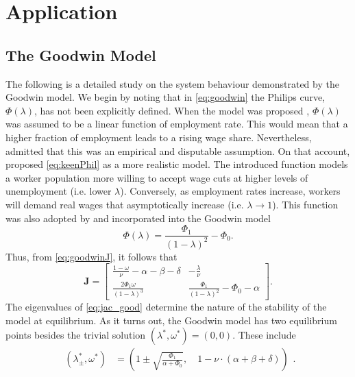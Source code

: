 \documentclass[12pt, centerh1]{article}
\begin{document}
\section{Application}

\subsection{The Goodwin Model}
The following is a detailed study on the system behaviour demonstrated by the Goodwin model. We begin by noting that in \eqref{eq:goodwin} the Philips curve, $\Phi(\lambda)$, has not been explicitly defined. When the model was proposed \citep{goodwin1982growth}, $\Phi(\lambda)$ was assumed to be a linear function of employment rate. This would mean that a higher fraction of employment leads to a rising wage share. Nevertheless, \citet{goodwin1982growth} admitted that this was an empirical and disputable assumption. On that account, \citet{keen1995finance} proposed \eqref{eq:keenPhil} as a more realistic model. The introduced function models a worker population more willing to accept wage cuts at higher levels of unemployment (i.e. lower $\lambda$). Conversely, as employment rates increase, workers will demand real wages that asymptotically increase (i.e. $\lambda\to1$). This function was also adopted by \citet{grasselli2012analysis} and incorporated into the Goodwin model
\begin{equation} \label{eq:keenPhil}
    \Phi(\lambda) = \frac{\Phi_1}{(1-\lambda)^2}-\Phi_0.
\end{equation}
Thus, from \eqref{eq:goodwinJ}, it follows that
\begin{equation} \label{eq:jac_good}
    \mathbf J = \begin{bmatrix}
        \frac{1-\omega}{\nu}-\alpha-\beta-\delta & -\frac{\lambda}{\nu}\\[1ex]
        \frac{2\Phi_1\omega}{(1-\lambda)^3} & \frac{\Phi_1}{(1-\lambda)^2}-\Phi_0-\alpha
\end{bmatrix}.
\end{equation}
The eigenvalues of \eqref{eq:jac_good} determine the nature of the stability of the model at equilibrium. As it turns out, the Goodwin model has two equilibrium points besides the trivial solution $(\lambda^\ast,\omega^\ast)=(0, 0)$. These include
\begin{equation} \label{eq:goodwin_eqm}
\begin{split}
    (\lambda_\pm^\ast, \omega^\ast) &= \left(1\pm\sqrt{\frac{\Phi_1}{\alpha + \Phi_0}},\quad  1-\nu\cdot(\alpha + \beta + \delta)\right)
\end{split}.
\end{equation}
\end{document}
